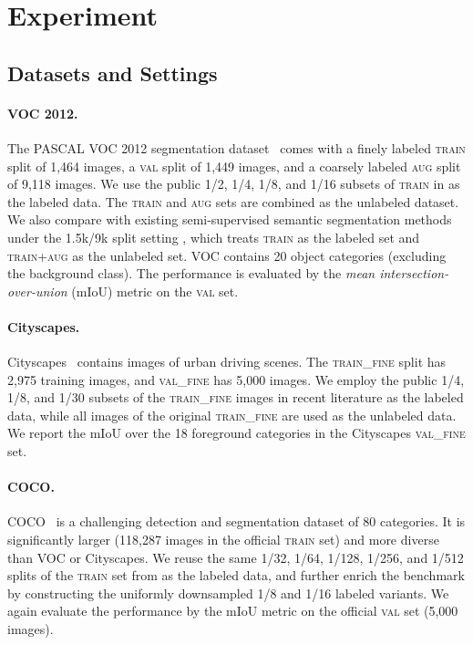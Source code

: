 \section{Experiment}

\subsection{Datasets and Settings}

\paragraph{VOC 2012.} The PASCAL VOC 2012 segmentation dataset~\cite{everingham2010pascal} comes with a finely labeled \textsc{train} split of 1,464 images, a \textsc{val} split of 1,449 images, and a coarsely labeled \textsc{aug} split of 9,118 images. We use the public 1/2, 1/4, 1/8, and 1/16 subsets of \textsc{train} in \cite{zou2020pseudoseg} as the labeled data. The \textsc{train} and \textsc{aug} sets are combined as the unlabeled dataset. 
We also compare with existing semi-supervised semantic segmentation methods under the 1.5k/9k split setting \cite{souly2017semi,hung2019adversarial,ouali2020semi,zou2020pseudoseg}, which treats \textsc{train} as the labeled set and \textsc{train}+\textsc{aug} as the unlabeled set. VOC contains 20 object categories (excluding the background class). The performance is evaluated by the \emph{mean intersection-over-union} (mIoU) metric on the \textsc{val} set.

\paragraph{Cityscapes.} Cityscapes~\cite{cordts2016cityscapes} contains images of urban driving scenes. The \textsc{train\_fine} split has 2,975 training images, and \textsc{val\_fine} has 5,000 images. We employ the public 1/4, 1/8, and 1/30 subsets of the \textsc{train\_fine} images in recent literature \cite{hung2019adversarial,mittal2019semi,fenga2020dmt,french2020semi,zou2020pseudoseg,olsson2021classmix} as the labeled data, while all images of the original \textsc{train\_fine} are used as the unlabeled data. We report the mIoU over the 18 foreground categories in the Cityscapes \textsc{val\_fine} set.

\paragraph{COCO.} COCO~\cite{lin2014microsoft} is a challenging detection and segmentation dataset of 80 categories. It is significantly larger (118,287 images in the official \textsc{train} set) and more diverse than VOC or Cityscapes. We reuse the same 1/32, 1/64, 1/128, 1/256, and 1/512 splits of the \textsc{train} set from \cite{zou2020pseudoseg} as the labeled data, and further enrich the benchmark by constructing the uniformly downsampled 1/8 and 1/16 labeled variants. We again evaluate the performance by the mIoU metric on the official \textsc{val} set (5,000 images).


